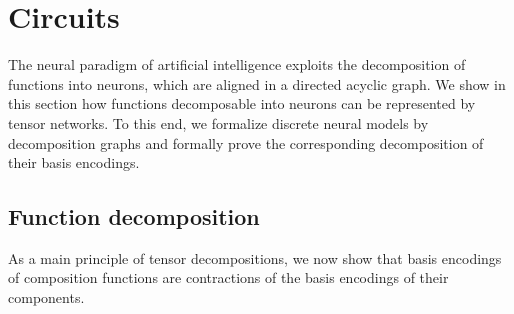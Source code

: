 \section{Circuits}

The neural paradigm of artificial intelligence exploits the decomposition of functions into neurons, which are aligned in a directed acyclic graph.
We show in this section how functions decomposable into neurons can be represented by tensor networks.
To this end, we formalize discrete neural models by decomposition graphs and formally prove the corresponding decomposition of their basis encodings.

\subsection{Function decomposition}

As a main principle of tensor decompositions, we now show that basis encodings of composition functions are contractions of the basis encodings of their components.

